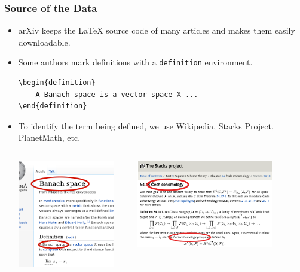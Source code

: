 \documentclass[10pt]{beamer}
\begin{document}
\begin{frame}[fragile]
    \frametitle{Source of the Data}
    \begin{itemize}
        \item arXiv keeps the \LaTeX{} source code of many articles and makes them easily downloadable.
            \pause
        \item Some authors mark definitions with a \texttt{definition} environment.
            \begin{verbatim}
\begin{definition}
    A Banach space is a vector space X ...
\end{definition}
    \end{verbatim}
    \pause
\item To identify the term being defined, we use Wikipedia, Stacks Project, PlanetMath, etc.
    \begin{columns}
        \begin{column}{0.4\textwidth}
            \includegraphics[width=0.9\textwidth]{../Images/wiki_thin_banach.png}
        \end{column}
        \pause
        \begin{column}{0.6\textwidth}
            \includegraphics[width=0.8\textwidth]{../Images/stacks_defs.png}

\end{column}
\end{columns}
\end{itemize}
\end{frame}
\end{document}

